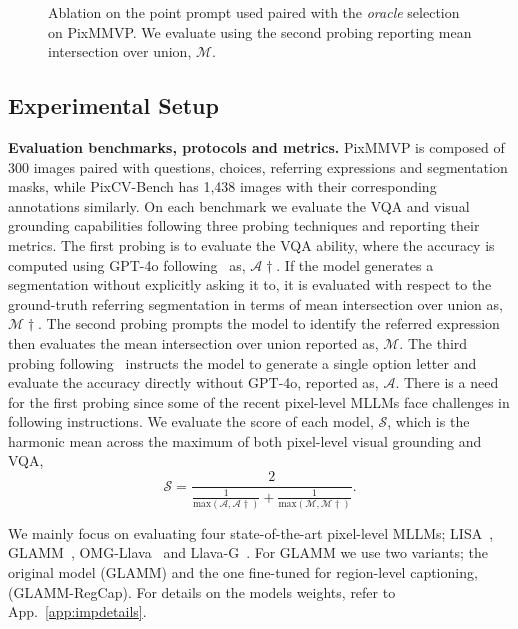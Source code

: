 \begin{figure}[t]
\centering

\vspace{-1em}
\caption{Ablation on the point prompt used paired with the \textit{oracle} selection on PixMMVP. We evaluate using the second probing reporting mean intersection over union, $\mathcal{M}$.}
\label{fig:ablation}
\vspace{-1em}
\end{figure}

\subsection{Experimental Setup}

\textbf{Evaluation benchmarks, protocols and metrics.}
PixMMVP is composed of 300 images paired with questions, choices, referring expressions and segmentation masks, while PixCV-Bench has 1,438 images with their corresponding annotations similarly. On each benchmark we evaluate the VQA and visual grounding capabilities following three probing techniques and reporting their metrics. The first probing is to evaluate the VQA ability, where the accuracy is computed using GPT-4o following~\cite{tong2024eyes} as, $\mathcal{A}\dagger$. If the model generates a segmentation without explicitly asking it to, it is evaluated with respect to the ground-truth referring segmentation in terms of mean intersection over union as, $\mathcal{M}\dagger$. The second probing prompts the model to identify the referred expression then evaluates the mean intersection over union reported as, $\mathcal{M}$. The third probing following~\cite{tong2024cambrian} instructs the model to generate a single option letter and evaluate the accuracy directly without GPT-4o, reported as, $\mathcal{A}$. There is a need for the first probing since some of the recent pixel-level MLLMs face challenges in following instructions. We evaluate the score of each model, $\mathcal{S}$, which is the harmonic mean across the maximum of both pixel-level visual grounding and VQA,
\begin{equation}
\mathcal{S} = \frac{2}{\frac{1}{\text{max}(\mathcal{A}, \mathcal{A}\dagger)} + \frac{1}{\text{max}(\mathcal{M}, \mathcal{M}\dagger)}}.
\end{equation}

We mainly focus on evaluating four state-of-the-art pixel-level MLLMs; LISA~\cite{lai2024lisa}, GLAMM~\cite{rasheed2024glamm}, OMG-Llava~\cite{zhang2024omg} and Llava-G~\cite{zhang2025llava}. For GLAMM we use two variants; the original model (GLAMM) and the one fine-tuned for region-level captioning, (GLAMM-RegCap). For details on the models weights, refer to App.~\ref{app:impdetails}.

